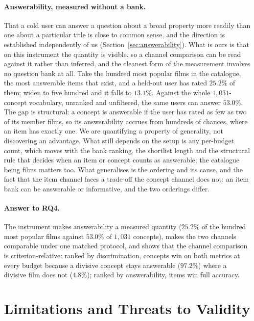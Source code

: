 \documentclass[acmsmall,review,anonymous]{acmart}
\begin{document}
\paragraph{Answerability, measured without a bank.} That a cold user can answer a question about a broad property more readily than one about a particular title is close to common sense, and the direction is established independently of us (Section~\ref{sec:answerability}). What is ours is that on this instrument the quantity is visible, so a channel comparison can be read against it rather than inferred, and the cleanest form of the measurement involves no question bank at all. Take the hundred most popular films in the catalogue, the most answerable items that exist, and a held-out user has rated $25.2\%$ of them; widen to five hundred and it falls to $13.1\%$. Against the whole $1{,}031$-concept vocabulary, unranked and unfiltered, the same users can answer $53.0\%$. The gap is structural: a concept is answerable if the user has rated as few as two of its member films, so its answerability accrues from hundreds of chances, where an item has exactly one. We are quantifying a property of generality, not discovering an advantage. What still depends on the setup is any per-budget count, which moves with the bank ranking, the shortlist length and the structural rule that decides when an item or concept counts as answerable; the catalogue being films matters too. What generalises is the ordering and its cause, and the fact that the item channel faces a trade-off the concept channel does not: an item bank can be answerable or informative, and the two orderings differ.

\paragraph{Answer to RQ4.} The instrument makes answerability a measured quantity ($25.2\%$ of the hundred most popular films against $53.0\%$ of $1{,}031$ concepts), makes the two channels comparable under one matched protocol, and shows that the channel comparison is criterion-relative: ranked by discrimination, concepts win on both metrics at every budget because a divisive concept stays answerable ($97.2\%$) where a divisive film does not ($4.8\%$); ranked by answerability, items win full accuracy.

\section{Limitations and Threats to Validity}\label{sec:limits}
\end{document}
